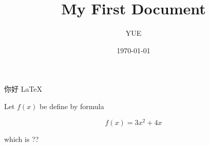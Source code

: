 \documentclass{article}%
\title{My First Document}
\author{YUE}
\date{\today}
\begin{document}
	\maketitle
	你好 \LaTeX
	
	Let $f(x)$ be define by formula
	
	
	$$f(x) = 3x^2 +4x$$
	
	which is ??
\end{document}
